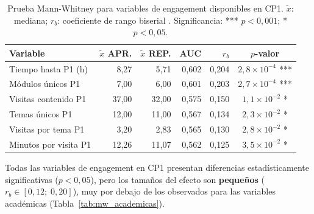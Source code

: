 \begin{table}[htbp]
  \centering
  \caption{Prueba Mann-Whitney para variables de engagement
           disponibles en CP1. $\tilde{x}$: mediana; $r_b$:
           coeficiente de rango biserial \cite{Kerby2014}.
           Significancia: *** $p < 0{,}001$; * $p < 0{,}05$.}
  \label{tab:mw_engagement}
  \begin{tabular}{lrrrrc}
    \toprule
    \textbf{Variable}
      & \textbf{$\tilde{x}$ APR.}
      & \textbf{$\tilde{x}$ REP.}
      & \textbf{AUC}
      & \textbf{$r_b$}
      & \textbf{$p$-valor} \\
    \midrule
    Tiempo hasta P1 (h)
      & 8,27  & 5,71  & 0,602 & 0,204
      & $2{,}8\times10^{-4}$ *** \\
    Módulos únicos P1
      & 7,00  & 6,00  & 0,601 & 0,203
      & $2{,}7\times10^{-4}$ *** \\
    Visitas contenido P1
      & 37,00 & 32,00 & 0,575 & 0,150
      & $1{,}1\times10^{-2}$ *   \\
    Temas únicos P1
      & 12,00 & 11,00 & 0,567 & 0,134
      & $2{,}3\times10^{-2}$ *   \\
    Visitas por tema P1
      & 3,20  & 2,83  & 0,565 & 0,130
      & $2{,}8\times10^{-2}$ *   \\
    Minutos por visita P1
      & 12,26 & 11,07 & 0,562 & 0,125
      & $3{,}5\times10^{-2}$ *   \\
    \bottomrule
  \end{tabular}
\end{table}

Todas las variables de engagement en CP1 presentan diferencias
estadísticamente significativas ($p < 0{,}05$), pero los
tamaños del efecto son \textbf{pequeños}
($r_b \in [0{,}12;\;0{,}20]$), muy por debajo de los observados
para las variables académicas (Tabla~\ref{tab:mw_academicas}).

